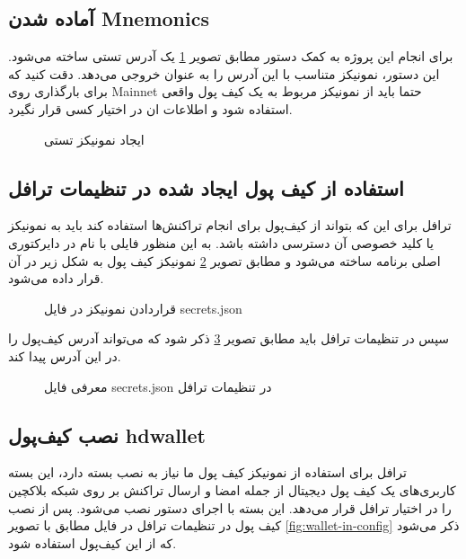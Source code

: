 \subsection{آماده شدن \gls{Mnemonics}}
برای انجام این پروژه به کمک دستور
مطابق تصویر
\ref{fig:mnemonics}
یک آدرس تستی ساخته می‌شود.
این دستور، نمونیکز متناسب با این آدرس را به عنوان خروجی می‌دهد. دقت کنید که برای بارگذاری روی
\gls{Mainnet}
حتما باید از نمونیکز مربوط به یک کیف پول واقعی استفاده شود و اطلاعات ان در اختیار کسی قرار نگیرد.

\begin{figure}
\centerline{}
\caption{ایجاد نمونیکز تستی}
\label{fig:mnemonics}
\end{figure}


\subsection{استفاده از کیف پول ایجاد شده در تنظیمات ترافل}
ترافل برای این که بتواند از کیف‌پول برای انجام تراکنش‌ها استفاده کند باید به نمونیکز یا کلید خصوصی آن دسترسی داشته باشد.
به این منظور فایلی با نام
در دایرکتوری اصلی برنامه ساخته می‌شود و مطابق تصویر
\ref{fig:mnemonics-in-secrets}
نمونیکز کیف پول به شکل زیر در آن قرار داده می‌شود.

\begin{figure}
\centerline{}
\caption{قراردادن نمونیکز در فایل secrets.json}
\label{fig:mnemonics-in-secrets}
\end{figure}

سپس در تنظیمات ترافل باید مطابق تصویر
\ref{fig:secrets-in-config}
ذکر شود که می‌تواند آدرس کیف‌پول را در این آدرس پیدا کند.

\begin{figure}
\centerline{}
\caption{معرفی فایل secrets.json در تنظیمات ترافل}
\label{fig:secrets-in-config}
\end{figure}


\subsection{نصب کیف‌پول hdwallet}
ترافل برای استفاده از نمونیکز کیف پول ما نیاز به نصب بسته
دارد،
این بسته کاربری‌های یک کیف پول دیجیتال از جمله امضا و ارسال تراکنش بر روی شبکه بلاکچین را در اختیار ترافل قرار می‌دهد.
این بسته با اجرای دستور
نصب می‌شود.  پس از نصب کیف پول در تنظیمات ترافل در فایل
مطابق با تصویر
\ref{fig:wallet-in-config}
ذکر می‌شود که از این کیف‌پول استفاده شود.


